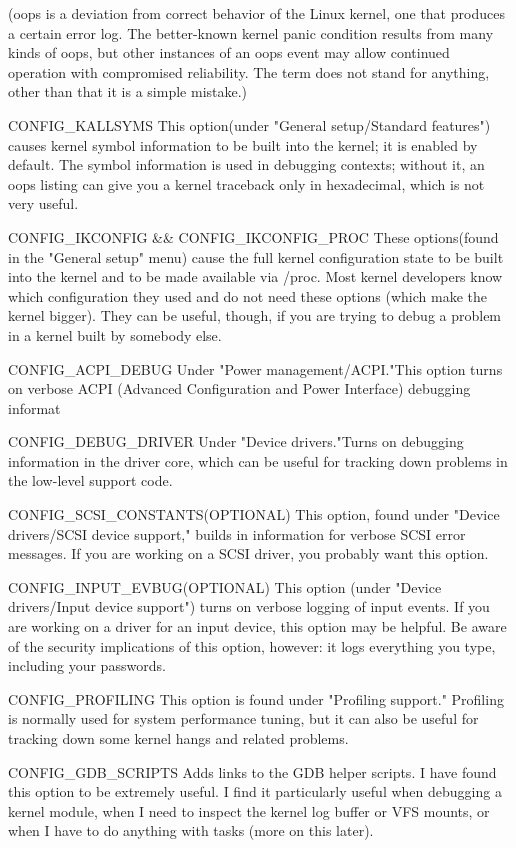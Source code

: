 \documentclass{masterthesis}
\begin{document}
\begin{itemize}
(oops is a deviation from correct behavior of the Linux kernel, one that produces a certain error log. The better-known kernel panic condition results from many kinds of oops, but other instances of an oops event may allow continued operation with compromised reliability. The term does not stand for anything, other than that it is a simple mistake.)

CONFIG_KALLSYMS
This option(under "General setup/Standard features") causes kernel symbol information to be built into the kernel; it is enabled by default. The symbol information is used in debugging contexts; without it, an oops listing can give you a kernel traceback only in hexadecimal, which is not very useful.

CONFIG_IKCONFIG && CONFIG_IKCONFIG_PROC
These options(found in the "General setup" menu)  cause the full kernel configuration state to be built into the kernel and to be made available via /proc. Most kernel developers know which configuration they used and do not need these options (which make the kernel bigger). They can be useful, though, if you are trying to debug a problem in a kernel built by somebody else.

CONFIG_ACPI_DEBUG
Under "Power management/ACPI."This option turns on verbose ACPI (Advanced Configuration and Power Interface) debugging informat

CONFIG_DEBUG_DRIVER
Under "Device drivers."Turns on debugging information in the driver core, which can be useful for tracking down problems in the low-level support code. 

CONFIG_SCSI_CONSTANTS(OPTIONAL)
This option, found under "Device drivers/SCSI device support," builds in information for verbose SCSI error messages. If you are working on a SCSI driver, you probably want this option.

CONFIG_INPUT_EVBUG(OPTIONAL)
This option (under "Device drivers/Input device support") turns on verbose logging of input events. If you are working on a driver for an input device, this option may be helpful. Be aware of the security implications of this option, however: it logs everything you type, including your passwords.

CONFIG_PROFILING
This option is found under "Profiling support." Profiling is normally used for system performance tuning, but it can also be useful for tracking down some kernel hangs and related problems.



CONFIG_GDB_SCRIPTS Adds links to the GDB helper scripts. I have found this option to be extremely useful. I find it particularly useful when debugging a kernel module, when I need to inspect the kernel log buffer or VFS mounts, or when I have to do anything with tasks (more on this later).


\end{itemize}
\end{document}
